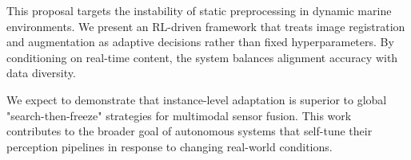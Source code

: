 This proposal targets the instability of static preprocessing in dynamic marine environments. We present an RL-driven framework that treats image registration and augmentation as adaptive decisions rather than fixed hyperparameters. By conditioning on real-time content, the system balances alignment accuracy with data diversity.

We expect to demonstrate that instance-level adaptation is superior to global "search-then-freeze" strategies for multimodal sensor fusion. This work contributes to the broader goal of autonomous systems that self-tune their perception pipelines in response to changing real-world conditions.
